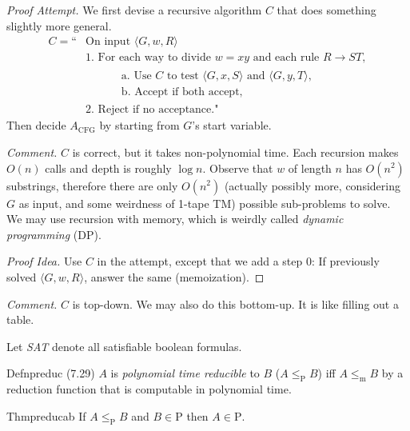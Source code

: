 \textit{Proof Attempt.}
We first devise a recursive algorithm $C$ that does something slightly more general.
\begin{align*}
  C=\text{``} & \text{On input }\langle G,w,R\rangle                                                          \\
              & \text{1. For each way to divide }w=xy\text{ and each rule }R\to ST,                           \\
              & \begin{aligned}
                  \qquad & \text{a. Use }C\text{ to test }\langle G,x,S\rangle\text{ and }\langle G,y,T\rangle, \\
                         & \text{b. Accept if both accept,}
                \end{aligned} \\
              & \text{2. Reject if no acceptance."}
\end{align*}
Then decide \( A_{\text{CFG}} \) by starting from \( G \)'s start variable.

\textit{Comment.} \( C \) is correct, but it takes non-polynomial time. Each recursion makes \( O(n) \) calls and depth is roughly \( \log n \). Observe that $w$ of length $n$ has $O(n^2)$ substrings, therefore there are only $O(n^2)$ (actually possibly more, considering $G$ as input, and some weirdness of 1-tape TM) possible sub-problems to solve. We may use recursion with memory, which is weirdly called \emph{dynamic programming} (DP).

\begin{proof}[Proof Idea]
  Use $C$ in the attempt, except that we add a step 0: If previously solved $\langle G,w,R\rangle$, answer the same (memoization).
\end{proof}

\textit{Comment.} $C$ is top-down. We may also do this bottom-up. It is like filling out a table.

Let \textit{SAT} denote all satisfiable boolean formulas.

\begin{reference}{Defn}{preduc}
  (7.29) $A$ is \emph{polynomial time reducible} to $B$ ($A\leq_{\mathrm{P}} B$) iff $A\leq_{\mathrm{m}} B$ by a reduction function that is computable in polynomial time.
\end{reference}

\begin{reference}{Thm}{preducab}
  If $A\leq_{\mathrm{P}}B$ and $B\in \mathrm{P}$ then $A\in \mathrm{P}$.
\end{reference}

